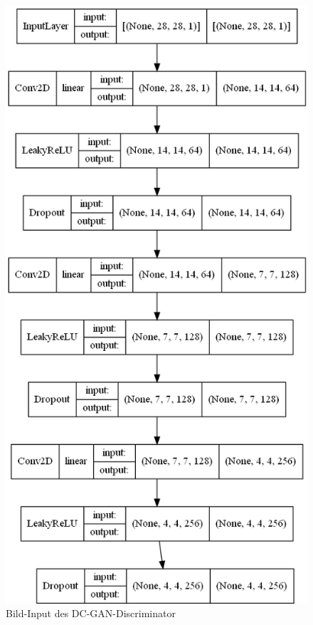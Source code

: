 \begin{figure}[H]
	\centering
	\includegraphics[width=0.45\textheight]{kapitel/5_ergebnisse/architectures/dcgan_disriminator/label_input.png}
	\caption{Bild-Input des DC-GAN-Discriminator}
	\label{architecture:dcgan-dis-bild}
\end{figure}

